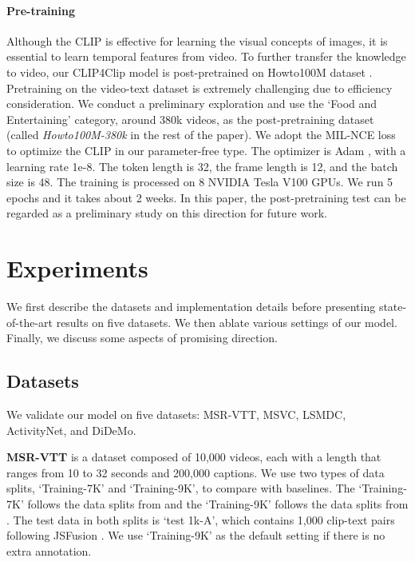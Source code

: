 \documentclass[11pt]{article}
\begin{document}
	\paragraph{Pre-training}
	Although the CLIP is effective for learning the visual concepts of images, it is essential to learn temporal features from video. To further transfer the knowledge to video, our CLIP4Clip model is post-pretrained on Howto100M dataset \cite{miech2019howto100m}. Pretraining on the video-text dataset is extremely challenging due to efficiency consideration. We conduct a preliminary exploration and use the `Food and Entertaining' category, around 380k videos, as the post-pretraining dataset (called \emph{Howto100M-380k} in the rest of the paper). We adopt the MIL-NCE loss \cite{miech19endtoend} to optimize the CLIP in our parameter-free type. The optimizer is Adam \cite{kingma2014adam}, with a learning rate 1e-8. The token length is 32, the frame length is 12, and the batch size is 48. The training is processed on 8 NVIDIA Tesla V100 GPUs. We run 5 epochs and it takes about 2 weeks. In this paper, the post-pretraining test can be regarded as a preliminary study on this direction for future work.

	\section{Experiments}
	We first describe the datasets and implementation details before presenting state-of-the-art results on five datasets. We then ablate various settings of our model. Finally, we discuss some aspects of promising direction.

	\subsection{Datasets}
	We validate our model on five datasets: MSR-VTT, MSVC, LSMDC, ActivityNet, and DiDeMo.

	\noindent
	\textbf{MSR-VTT} \cite{xu2016msr} is a dataset composed of 10,000 videos, each with a length that ranges from 10 to 32 seconds and 200,000 captions. We use two types of data splits, `Training-7K' and `Training-9K', to compare with baselines. The `Training-7K' follows the data splits from \cite{miech2019howto100m} and the `Training-9K' follows the data splits from \cite{Gabeur2020MMT}. The test data in both splits is `test 1k-A', which contains 1,000 clip-text pairs following JSFusion \cite{yu2018joint}. We use `Training-9K' as the default setting if there is no extra annotation.
\end{document}
